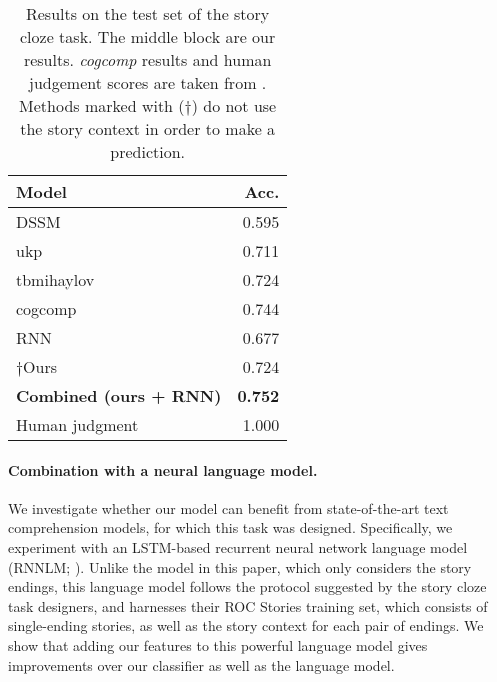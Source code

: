 \documentclass[11pt,a4paper]{article}
\newcommand{\com}[1]{}
\newcommand{\resolved}[1]{}
\newcommand{\yc}[1]{{\color{bblue}\{\textit{#1}\}$_{yc}$}}
\newcommand{\nascomment}[1]{{\color{blue}\textsc{[#1 --nas]}}}
\renewcommand{\nascomment}[1]{}
\renewcommand{\yc}[1]{}
\begin{document}
\begin{table}[!t]
\begin{center}
\begin{tabular}{|l|r|} \hline
{\bf Model} & {\bf Acc.} \\ \hline
{DSSM} \cite{Mostafazadeh:2016} & 0.595 \\ 
{ukp} \cite{Mihaylov:2017} & 0.711\\ 
{tbmihaylov} \cite{Mihaylov:2017} & 0.724\\ 
{cogcomp}  & 0.744 \\ \hline\hline
{RNN}		& 0.677 \\ 
$\dagger${Ours} & {0.724} \\ 
{\bf Combined (ours + RNN)} & {\bf 0.752} \\ \hline\hline
Human judgment & 1.000 \\ \hline
\end{tabular}
\end{center}
\caption{\label{cloze_results}\resolved{\yc{we should change accuracy to be in 0-100\% scale to be consistent with Table 2}}Results on the test set of the  story cloze task.\com{
The upper block shows published results, }
The middle block are our results.
{\it cogcomp} results and human judgement scores are taken from \cite{Mostafazadeh:2017}.
Methods marked with ($\dagger$) do not use the story context in order to make a prediction. 
 \resolved{\nascomment{I added 0s to ``Niko'' result
  and ``human''
  so sig. digits would line up.  if we don't have sig digits for some
  of them, make the zeros white so the numbers line up.  where did the
human judgments come from?  those are not mentioned in our text anywhere!}
}}
\end{table}


\paragraph{Combination with a neural language model.}
We investigate whether our model can benefit from state-of-the-art text comprehension models, for which this task was designed. 
Specifically, we experiment with an LSTM-based \cite{hochreiter1997long} recurrent neural network language model (RNNLM; \citealp{mikolov2010recurrent}). %
Unlike the model in this paper, which only considers the story endings, this language model follows the protocol suggested by the story cloze task designers, and harnesses their ROC Stories training set, which consists of single-ending stories, 
as well as the story context for each pair of endings. 
We show that adding our features to this powerful language model
gives improvements over our classifier as well as the language
model.  \resolved{\nascomment{reworded.  more important that our features help
  the language model, than the other way around!}}
\end{document}
